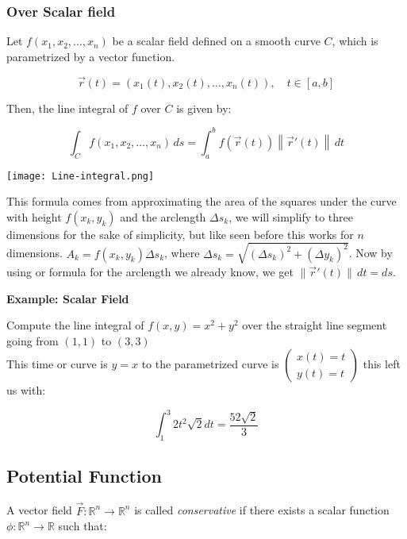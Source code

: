 \subsubsection{Over Scalar field}

Let \( f(x_1, x_2, \ldots, x_n) \) be a scalar field defined on a smooth curve \( C \), which 
is parametrized by a vector function.

\[
\vec{r}(t) = (x_1(t), x_2(t), \ldots, x_n(t)), \quad t \in [a, b]
\]

Then, the line integral of \( f \) over \( C \) is given by:

\[
\int_C f(x_1, x_2, \ldots, x_n) \, ds = \int_a^b f(\vec{r}(t)) \left\| \vec{r}'(t) \right\| \, dt
\]


\begin{center}
    \texttt{[image: Line-integral.png]}
\end{center}

This formula comes from approximating the area of the squares under the curve with height \(f(x_k, y_k)\) 
and the arclength \(\varDelta s_k\), we will simplify to three dimensions for the sake
of simplicity, but like seen before this works for \(n\) dimensions. 
\(A_k = f(x_k, y_k) \varDelta s_k\), where 
\(\varDelta s_k = \sqrt{(\varDelta s_k)^2 + (\varDelta y_k)^2} \). Now by using or formula for the arclength
we already know, we get \(\|\vec{r}' (t)\| \, dt = ds\). 

\textbf{Example: Scalar Field}
\vspace{\baselineskip}

Compute the line integral of \(f(x,y) = x^2 + y^2\) over the straight line segment going
from \((1,1)\) to \((3,3)\)
\\
This time or curve is \(y = x\) to the parametrized curve is \(\begin{pmatrix}
    x(t) = t \\ y(t) = t
\end{pmatrix}\) this left us with:

\[
\int_{1}^{3}  2t^2 \sqrt{2}dt = \frac{52\sqrt{2}}{3} 
\]

\subsection{Potential Function}

A vector field \( \vec{F} : \mathbb{R}^n \to \mathbb{R}^n \) is called \emph{conservative} if there exists a scalar function \( \phi : \mathbb{R}^n \to \mathbb{R} \) such that:


